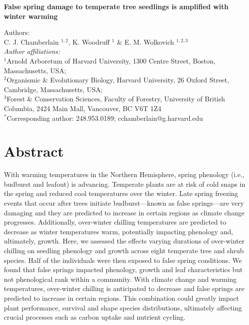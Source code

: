 \documentclass{article}\usepackage[]{graphicx}\usepackage[]{color}
\begin{document}
\noindent \textbf{\Large{False spring damage to temperate tree seedlings is amplified with winter warming}}

\noindent Authors:\\
C. J. Chamberlain $^{1,2}$, K. Woodruff $^{1}$ \& E. M. Wolkovich $^{1,2,3}$
\vspace{2ex}\\
\emph{Author affiliations:}\\
$^{1}$Arnold Arboretum of Harvard University, 1300 Centre Street, Boston, Massachusetts, USA; \\
$^{2}$Organismic \& Evolutionary Biology, Harvard University, 26 Oxford Street, Cambridge, Massachusetts, USA; \\
$^{3}$Forest \& Conservation Sciences, Faculty of Forestry, University of British Columbia, 2424 Main Mall, Vancouver, BC V6T 1Z4\\
\vspace{2ex}
$^*$Corresponding author: 248.953.0189; cchamberlain@g.harvard.edu\\

\renewcommand{\thetable}{\arabic{table}}
\renewcommand{\thefigure}{\arabic{figure}}
\renewcommand{\labelitemi}{$-$}


\section*{Abstract} %
With warming temperatures in the Northern Hemisphere, spring phenology (i.e., budburst and leafout) is advancing. Temperate plants are at risk of cold snaps in the spring and reduced cool temperatures over the winter. Late spring freezing events that occur after trees initiate budburst---known as false springs---are very damaging and they are predicted to increase in certain regions as climate change progresses. Additionally, over-winter chilling temperatures are predicted to decrease as winter temperatures warm, potentially impacting phenology and, ultimately, growth. Here, we assessed the effects varying durations of over-winter chilling on seedling phenology and growth across eight temperate tree and shrub species. Half of the individuals were then exposed to false spring conditions. We found that false springs impacted phenology, growth and leaf characteristics but not phenological rank within a community. %
With climate change and warming temperatures, over-winter chilling is anticipated to decrease and false springs are predicted to increase in certain regions. This combination could greatly impact plant performance, survival and shape species distributions, ultimately affecting crucial processes such as carbon uptake and nutrient cycling.
\end{document}
